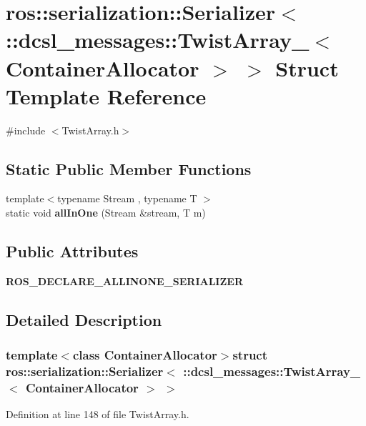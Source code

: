 \section{ros\-:\-:serialization\-:\-:\-Serializer$<$ \-:\-:dcsl\-\_\-messages\-:\-:\-Twist\-Array\-\_\-$<$ \-Container\-Allocator $>$ $>$ \-Struct \-Template \-Reference}
\label{structros_1_1serialization_1_1Serializer_3_01_1_1dcsl__messages_1_1TwistArray___3_01ContainerAllocator_01_4_01_4}


{\ttfamily \#include $<$\-Twist\-Array.\-h$>$}

\subsection*{\-Static \-Public \-Member \-Functions}
\begin{DoxyCompactItemize}
\item 
{\footnotesize template$<$typename Stream , typename T $>$ }\\static void {\bf all\-In\-One} (\-Stream \&stream, \-T m)
\end{DoxyCompactItemize}
\subsection*{\-Public \-Attributes}
\begin{DoxyCompactItemize}
\item 
{\bf \-R\-O\-S\-\_\-\-D\-E\-C\-L\-A\-R\-E\-\_\-\-A\-L\-L\-I\-N\-O\-N\-E\-\_\-\-S\-E\-R\-I\-A\-L\-I\-Z\-E\-R}
\end{DoxyCompactItemize}


\subsection{\-Detailed \-Description}
\subsubsection*{template$<$class Container\-Allocator$>$struct ros\-::serialization\-::\-Serializer$<$ \-::dcsl\-\_\-messages\-::\-Twist\-Array\-\_\-$<$ Container\-Allocator $>$ $>$}



\-Definition at line 148 of file \-Twist\-Array.\-h.



